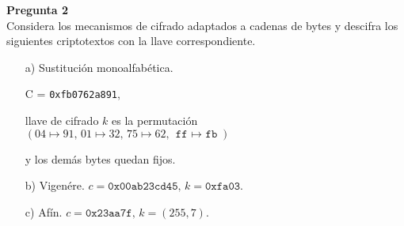 \documentclass{article}
\newenvironment{problem}[2][Pregunta]
    { \begin{mdframed}[backgroundcolor=gray!20] \textbf{#1 #2} \\}
    {  \end{mdframed}}
\begin{document}
\begin{problem}{2}
  Considera los mecanismos de cifrado adaptados a cadenas de bytes y descifra los siguientes
  criptotextos con la llave correspondiente.

  \begin{enumerate}
  \item[a)] Sustitución monoalfabética.
    
    C = {\tt 0xfb0762a891},

    llave de cifrado $k$ es la permutación $(04 \mapsto 91,\, 01 \mapsto 32,\, 75 \mapsto 62,\,
    \texttt{ff $\mapsto$ fb})$
    
    y los demás bytes quedan fijos. 
  \item[b)] Vigenére. $c = \texttt{0x00ab23cd45},\, k = \texttt{0xfa03}$.
  \item[c)] Afín. $c = \texttt{0x23aa7f},\, k = (255, 7)$.
  \end{enumerate}
\end{problem}
\end{document}
